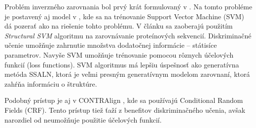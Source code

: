 Problém inverzného zarovnania bol prvý krát formulovaný v \cite{inverseAlign1}.
Na tomto probléme je postavený aj model v \cite{svmTrainingProteinsAlignment}, kde sa na trénovanie Support Vector Machine (SVM) dá pozerať ako na riešenie tohto problému. V článku sa zaoberajú použitím \textit{Structural SVM} algoritmu na zarovnávanie proteínových sekvencií. Diskriminačné učenie umožňuje zahrnutie množstva dodatočnej informácie -- státisíce parametrov.
Navyše SVM umožňuje trénovanie pomocou rôznych účelových funkcií (loss functions).
SVM algoritmus má lepšiu úspešnosť ako generatívna metóda SSALN, ktorá je veľmi presným generatívnym modelom zarovnaní, ktorá zahŕňa informáciu o štruktúre.

Podobný prístup je aj v CONTRAlign \cite{contralign}, kde sa používajú Conditional Random Fields (CRF). Tento prístup tiež ťaží z benefitov diskriminačného učenia, avšak narozdiel od \cite{svmTrainingProteinsAlignment} neumožňuje použitie účelových funkcií.
